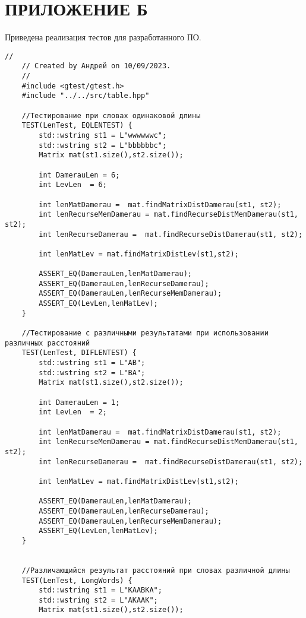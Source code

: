 \chapter*{\hfill \centering ПРИЛОЖЕНИЕ Б\hfill}
Приведена реализация тестов для разработанного ПО.
\begin{lstlisting}[label=lst:unit_tests, caption=Модульные тесты]
    //
    // Created by Андрей on 10/09/2023.
    //
    #include <gtest/gtest.h>
    #include "../../src/table.hpp"
    
    //Тестирование при словах одинаковой длины
    TEST(LenTest, EQLENTEST) {
        std::wstring st1 = L"wwwwwwc";
        std::wstring st2 = L"bbbbbbc";
        Matrix mat(st1.size(),st2.size());
        
        int DamerauLen = 6;
        int LevLen  = 6;
        
        int lenMatDamerau =  mat.findMatrixDistDamerau(st1, st2);
        int lenRecurseMemDamerau = mat.findRecurseDistMemDamerau(st1, st2);
        int lenRecurseDamerau =  mat.findRecurseDistDamerau(st1, st2);
        
        int lenMatLev = mat.findMatrixDistLev(st1,st2);
        
        ASSERT_EQ(DamerauLen,lenMatDamerau);
        ASSERT_EQ(DamerauLen,lenRecurseDamerau);
        ASSERT_EQ(DamerauLen,lenRecurseMemDamerau);
        ASSERT_EQ(LevLen,lenMatLev);
    }
    
    //Тестирование с различными результатами при использовании различных расстояний
    TEST(LenTest, DIFLENTEST) {
        std::wstring st1 = L"AB";
        std::wstring st2 = L"BA";
        Matrix mat(st1.size(),st2.size());
        
        int DamerauLen = 1;
        int LevLen  = 2;
        
        int lenMatDamerau =  mat.findMatrixDistDamerau(st1, st2);
        int lenRecurseMemDamerau = mat.findRecurseDistMemDamerau(st1, st2);
        int lenRecurseDamerau =  mat.findRecurseDistDamerau(st1, st2);
        
        int lenMatLev = mat.findMatrixDistLev(st1,st2);
        
        ASSERT_EQ(DamerauLen,lenMatDamerau);
        ASSERT_EQ(DamerauLen,lenRecurseDamerau);
        ASSERT_EQ(DamerauLen,lenRecurseMemDamerau);
        ASSERT_EQ(LevLen,lenMatLev);
    }
    
    
    //Различающийся результат расстояний при словах различной длины
    TEST(LenTest, LongWords) {
        std::wstring st1 = L"KAABKA";
        std::wstring st2 = L"AKAAK";
        Matrix mat(st1.size(),st2.size());
        

\end{lstlisting}
